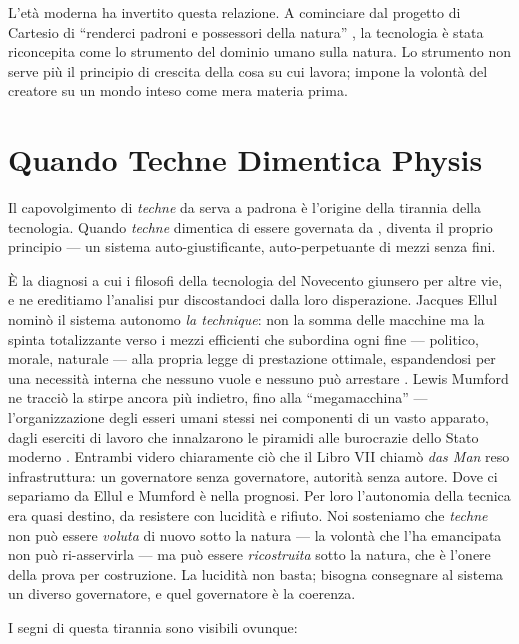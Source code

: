 L'et\`a moderna ha invertito questa relazione. A cominciare dal progetto
di Cartesio di ``renderci padroni e possessori della natura''
\parencite{heidegger1977question}, la tecnologia \`e stata riconcepita
come lo strumento del dominio umano sulla natura. Lo strumento non serve
pi\`u il principio di crescita della cosa su cui lavora; impone la
volont\`a del creatore su un mondo inteso come mera materia prima.

\section{Quando Techne Dimentica Physis}

Il capovolgimento di \emph{techne} da serva a padrona \`e l'origine
della tirannia della tecnologia. Quando \emph{techne} dimentica di essere
governata da \physis, diventa il proprio principio --- un sistema
auto-giustificante, auto-perpetuante di mezzi senza fini.

\`E la diagnosi a cui i filosofi della tecnologia del Novecento giunsero per
altre vie, e ne ereditiamo l'analisi pur discostandoci dalla loro
disperazione. Jacques Ellul nomin\`o il sistema autonomo \emph{la technique}:
non la somma delle macchine ma la spinta totalizzante verso i mezzi efficienti
che subordina ogni fine --- politico, morale, naturale --- alla propria legge di
prestazione ottimale, espandendosi per una necessit\`a interna che nessuno vuole
e nessuno pu\`o arrestare \parencite{ellul1964technological}. Lewis Mumford ne
tracci\`o la stirpe ancora pi\`u indietro, fino alla ``megamacchina'' ---
l'organizzazione degli esseri umani stessi nei componenti di un vasto apparato,
dagli eserciti di lavoro che innalzarono le piramidi alle burocrazie dello Stato
moderno \parencite{mumford1934technics}. Entrambi videro chiaramente ci\`o che il
Libro VII chiam\`o \emph{das Man} reso infrastruttura: un governatore senza
governatore, autorit\`a senza autore. Dove ci separiamo da Ellul e Mumford \`e
nella prognosi. Per loro l'autonomia della tecnica era quasi destino, da
resistere con lucidit\`a e rifiuto. Noi sosteniamo che \emph{techne} non pu\`o
essere \emph{voluta} di nuovo sotto la natura --- la volont\`a che l'ha emancipata
non pu\`o ri-asservirla --- ma pu\`o essere \emph{ricostruita} sotto la natura,
che \`e l'onere della prova per costruzione. La lucidit\`a non basta; bisogna
consegnare al sistema un diverso governatore, e quel governatore \`e la coerenza.

I segni di questa tirannia sono visibili ovunque:

